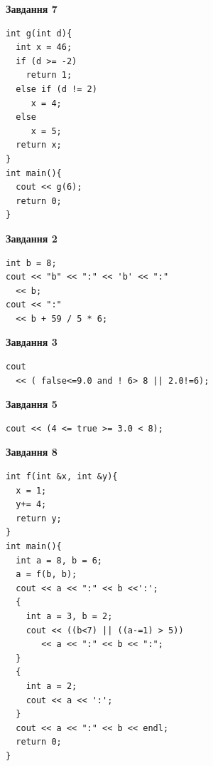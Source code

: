 \documentclass[12pt, ukrainian]{article}
\begin{document}
{\begin {large}
\begin{minipage}[t]{7.0cm}
\begin{center}
\textbf{Завдання 7}
\end{center}
\vspace{-8mm}

\begin{verbatim}
int g(int d){
  int x = 46;
  if (d >= -2)
    return 1;
  else if (d != 2)
     x = 4;
  else
     x = 5;
  return x;
}
int main(){
  cout << g(6);
  return 0;
}
\end{verbatim}

\end{minipage}
\vline \hspace{1mm}
\begin{minipage}[t]{11.0cm}

\begin{center}
\textbf{Завдання 2}
\end{center}
\vspace{-8mm}

\begin{verbatim}
int b = 8;
cout << "b" << ":" << 'b' << ":" 
  << b;
cout << ":" 
  << b + 59 / 5 * 6;
\end{verbatim}



\begin{center}
\textbf{Завдання 3}
\end{center}
\vspace{-8mm}

\begin{verbatim}
cout 
  << ( false<=9.0 and ! 6> 8 || 2.0!=6);
\end{verbatim}



\begin{center}
\textbf{Завдання 5}
\end{center}
\vspace{-8mm}

\begin{verbatim}
cout << (4 <= true >= 3.0 < 8);
\end{verbatim}



\begin{center}
\textbf{Завдання 8}
\end{center}
\vspace{-8mm}

\begin{verbatim}
int f(int &x, int &y){
  x = 1;
  y+= 4;
  return y;
}
int main(){
  int a = 8, b = 6;
  a = f(b, b);
  cout << a << ":" << b <<':';
  {
    int a = 3, b = 2;
    cout << ((b<7) || ((a-=1) > 5))
       << a << ":" << b << ":";
  }
  {
    int a = 2;
    cout << a << ':';
  }
  cout << a << ":" << b << endl;
  return 0;
}
\end{verbatim}


\end{minipage}
\end{large}}
\end{document}
